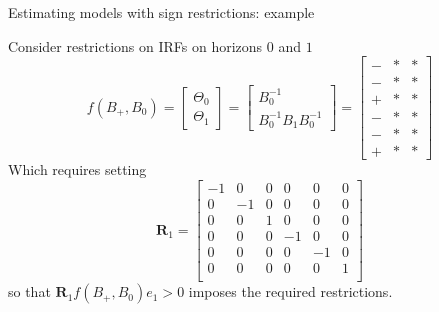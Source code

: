 \documentclass[notes,blackandwhite,mathsans,usenames,dvipsnames]{beamer}
\begin{document}
\begin{frame}{Estimating models with sign restrictions: example}

{\color{mcxs2}Consider restrictions on IRFs on horizons} $0$ {\color{mcxs2}and} $1$\footnotesize
$$f(B_+,B_0) =\begin{bmatrix}\Theta_0\\ \Theta_1\end{bmatrix} = \begin{bmatrix}B_0^{-1}\\ B_0^{-1}B_1B_0^{-1}\end{bmatrix}=
\begin{bmatrix} -&*&*\\ -&*&*\\ +&*&*\\ -&*&*\\ -&*&*\\ +&*&* \end{bmatrix}$$
\normalsize {\color{mcxs2}Which requires setting} \footnotesize
$$\mathbf{R}_1 = \begin{bmatrix} 
-1&0&0&0&0&0\\  
0&-1&0&0&0&0\\
0&0&1&0&0&0\\
0&0&0&-1&0&0\\
0&0&0&0&-1&0\\
0&0&0&0&0&1\\
\end{bmatrix}$$
\normalsize {\color{mcxs2}so that} $\mathbf{R}_1f(B_+,B_0)e_1>0$ {\color{mcxs2}imposes the required restrictions.}

\end{frame}
\end{document}
